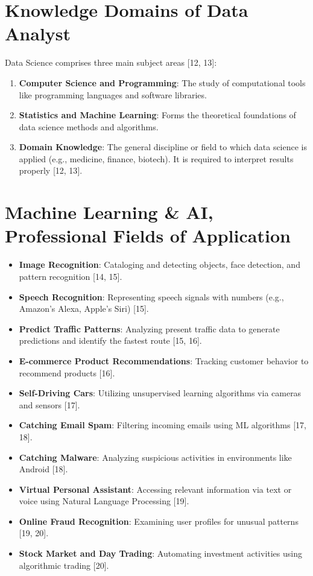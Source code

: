 \documentclass[
  letterpaper,
  DIV=11,
  numbers=noendperiod]{scrreprt}
\providecommand{\tightlist}{%
  \setlength{\itemsep}{0pt}\setlength{\parskip}{0pt}}
\begin{document}
\section{Knowledge Domains of Data
Analyst}\label{knowledge-domains-of-data-analyst}

Data Science comprises three main subject areas {[}12, 13{]}:

\begin{enumerate}
\def\labelenumi{\arabic{enumi}.}
\tightlist
\item
  \textbf{Computer Science and Programming}: The study of computational
  tools like programming languages and software libraries.
\item
  \textbf{Statistics and Machine Learning}: Forms the theoretical
  foundations of data science methods and algorithms.
\item
  \textbf{Domain Knowledge}: The general discipline or field to which
  data science is applied (e.g., medicine, finance, biotech). It is
  required to interpret results properly {[}12, 13{]}.
\end{enumerate}

\section{Machine Learning \& AI, Professional Fields of
Application}\label{machine-learning-ai-professional-fields-of-application}

\begin{itemize}
\tightlist
\item
  \textbf{Image Recognition}: Cataloging and detecting objects, face
  detection, and pattern recognition {[}14, 15{]}.
\item
  \textbf{Speech Recognition}: Representing speech signals with numbers
  (e.g., Amazon's Alexa, Apple's Siri) {[}15{]}.
\item
  \textbf{Predict Traffic Patterns}: Analyzing present traffic data to
  generate predictions and identify the fastest route {[}15, 16{]}.
\item
  \textbf{E-commerce Product Recommendations}: Tracking customer
  behavior to recommend products {[}16{]}.
\item
  \textbf{Self-Driving Cars}: Utilizing unsupervised learning algorithms
  via cameras and sensors {[}17{]}.
\item
  \textbf{Catching Email Spam}: Filtering incoming emails using ML
  algorithms {[}17, 18{]}.
\item
  \textbf{Catching Malware}: Analyzing suspicious activities in
  environments like Android {[}18{]}.
\item
  \textbf{Virtual Personal Assistant}: Accessing relevant information
  via text or voice using Natural Language Processing {[}19{]}.
\item
  \textbf{Online Fraud Recognition}: Examining user profiles for unusual
  patterns {[}19, 20{]}.
\item
  \textbf{Stock Market and Day Trading}: Automating investment
  activities using algorithmic trading {[}20{]}.
\end{itemize}
\end{document}
